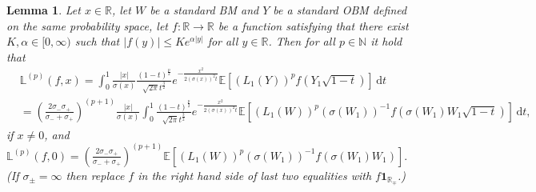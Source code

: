 \documentclass[12pt]{article}
\numberwithin{equation}{section}
\newtheorem{lemma}{Lemma}
\theoremstyle{definition}
\theoremstyle{remark}
\newcommand{\NN}{\mathbb{N}}
\newcommand{\RR}{\mathbb{R}}
\newcommand{\EE}{\mathbb{E}}
\newcommand{\ind}[1]{\mathbf{1}_{#1}}
\newcommand{\vd}{\,\mathrm{d}}
\newcommand{\Lm}[3]{\mathbb{L}^{(#2)}(#1,#3)}
\begin{document}
\begin{lemma} \label{lem:prop:G}
Let $x\in \RR$,
let $W$ be a standard BM and $Y$ be a standard OBM defined on the same probability space,
let $f\colon \RR \to \RR$ be a function satisfying that there exist $K,\alpha\in [0,\infty)$ such that $|f(y)|\leq K e^{\alpha |y|}$ for all $y\in \RR$. 
Then for all $p\in \NN$ it hold that
\begin{equation}
\begin{split} 
	& \Lm{f}{p}{x}
	 = \int_0^1 \frac{|x|}{\sigma(x)} \frac{(1-t)^\frac{p}{2}}{\sqrt{2\pi} t^\frac32} e^{-\frac{x^2}{2 (\sigma(x))^2 t}} 
	\EE\!\left[ \left( L_1(Y)\right)^p f(Y_1 \sqrt{1-t})\right]\! \vd t
	\\
	& 
	= \left(\frac{2 \sigma_-\sigma_+}{\sigma_-+\sigma_+}\right)^{\! (p+1)} \frac{|x|}{\sigma(x)}
	\int_0^1  \frac{(1-t)^\frac{p}{2}}{\sqrt{2\pi} t^\frac32} e^{-\frac{x^2}{2 (\sigma(x))^2 t}} 
	\EE\!\left[ \left( L_1(W)\right)^p (\sigma(W_1))^{-1} f(\sigma( W_1) W_1 \sqrt{1-t})  \right] \! \vd t,
\end{split}
\end{equation}
if $x\neq 0$, and 
$ 
	\Lm{f}{p}{0}
	= \left(\frac{2 \sigma_-\sigma_+}{\sigma_-+\sigma_+}\right)^{\! (p+1)} 
	\EE\!\left[ \left( L_1(W)\right)^p (\sigma(W_1))^{-1} f(\sigma( W_1) W_1) \right] \!.
$\\
(If $\sigma_\pm=\infty$ then replace $f$ in the right hand side of last two equalities with $f \ind{\RR_\mp}$.)
\end{lemma}
%
%
%
\end{document}
